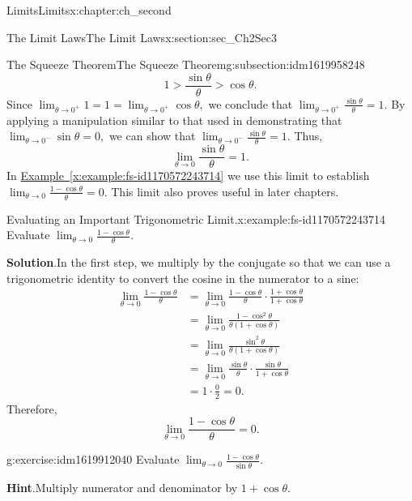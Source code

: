 \documentclass[oneside,10pt,]{book}
\newcommand{\blocktitlefont}{\relax}
\newcommand{\xreffont}{\relax}
\numberwithin{equation}{section}
\newcommand{\gt}{>}
\newcommand{\amp}{&}
\begin{document}
\begin{chapterptx}{Limits}{}{Limits}{}{}{x:chapter:ch_second}
\begin{sectionptx}{The Limit Laws}{}{The Limit Laws}{}{}{x:section:sec_Ch2Sec3}
\begin{subsectionptx}{The Squeeze Theorem}{}{The Squeeze Theorem}{}{}{g:subsection:idm1619958248}
\begin{equation*}
1\gt \frac{\sin \theta}{\theta}\gt \cos \theta.
\end{equation*}
Since \(\lim_{\theta\to 0^+}1=1=\lim_{\theta\to 0^+}\cos \theta,\) we conclude that \(\lim_{\theta\to 0^+}\frac{\sin \theta}{\theta}=1.\) By applying a manipulation similar to that used in demonstrating that \(\lim_{\theta\to 0^-}\sin \theta=0,\) we can show that \(\lim_{\theta\to 0^-}\frac{\sin \theta}{\theta}=1.\) Thus,%
%
\begin{equation*}
\lim_{\theta\to0}\frac{\sin \theta}{\theta}=1.
\end{equation*}
In \hyperref[x:example:fs-id1170572243714]{Example~{\xreffont\ref{x:example:fs-id1170572243714}}} we use this limit to establish \(\lim_{\theta\to0}\frac{1-\cos \theta}{\theta}=0.\) This limit also proves useful in later chapters.%
\begin{example}{Evaluating an Important Trigonometric Limit.}{x:example:fs-id1170572243714}%
Evaluate \(\lim_{\theta\to0}\frac{1-\cos \theta}{\theta}.\)%
\par\smallskip%
\noindent\textbf{\blocktitlefont Solution}.\hypertarget{g:solution:idm1619914856}{}\quad{}In the first step, we multiply by the conjugate so that we can use a trigonometric identity to convert the cosine in the numerator to a sine:%
%
\begin{align*}
\lim_{\theta\to0}\frac{1-\cos \theta}{\theta}\amp=\lim_{\theta\to0}\frac{1-\cos \theta}{\theta}\cdot \frac{1+\cos \theta}{1+\cos \theta}\\
\amp=\lim_{\theta\to0}\frac{1-\cos^2\theta}{\theta(1+\cos \theta)}\\
\amp=\lim_{\theta\to0}\frac{\sin^2 \theta}{\theta(1+\cos \theta)}\\
\amp=\lim_{\theta\to0}\frac{\sin \theta}{\theta}\cdot \frac{\sin \theta}{1+\cos \theta}\\
\amp=1\cdot \frac{0}{2}=0.
\end{align*}
Therefore,%
%
\begin{equation*}
\lim_{\theta\to0}\frac{1-\cos \theta}{\theta}=0.
\end{equation*}
\end{example}
\begin{inlineexercise}{}{g:exercise:idm1619912040}%
Evaluate \(\lim_{\theta\to0}\frac{1-\cos \theta}{\sin \theta}.\)%
\par\smallskip%
\noindent\textbf{\blocktitlefont Hint}.\hypertarget{g:hint:idm1619909992}{}\quad{}Multiply numerator and denominator by \(1+\cos \theta.\)%
\par\smallskip%

\end{inlineexercise}
\end{subsectionptx}
\end{sectionptx}
\end{chapterptx}
\end{document}
